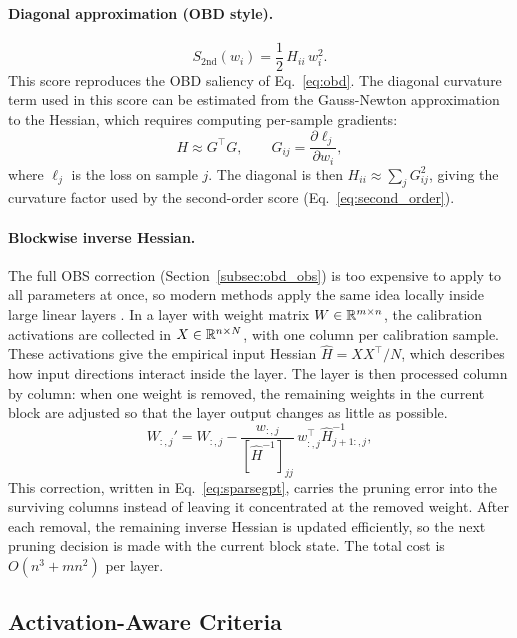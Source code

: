 \paragraph{Diagonal approximation (OBD style).}
\begin{equation}
	S_{\mathrm{2nd}}(w_i) = \frac{1}{2}\,H_{ii}\,w_i^2.
	\label{eq:second_order}
\end{equation}
This score reproduces the OBD saliency of Eq.~\eqref{eq:obd}. The diagonal curvature term used in this score can be estimated from the Gauss-Newton approximation to the Hessian,
which requires computing per-sample gradients:
\begin{equation}
	H \approx G^\top G, \qquad G_{ij} = \frac{\partial \ell_j}{\partial w_i},
\end{equation}
where $\ell_j$ is the loss on sample $j$. The diagonal is then
$H_{ii} \approx \sum_j G_{ij}^2$, giving the curvature factor used by the second-order score (Eq.~\eqref{eq:second_order}).

\paragraph{Blockwise inverse Hessian.}
The full OBS correction (Section~\ref{subsec:obd_obs}) is too expensive to apply to all parameters at once, so modern methods apply the same idea locally inside large linear layers \cite{hassibi1993second,frantar2023sparsegpt}. In a layer with weight matrix $W \in \mathbb{R}^{m \times n}$, the calibration activations are collected in $X \in \mathbb{R}^{n \times N}$, with one column per calibration sample. These activations give the empirical input Hessian $\hat{H}=XX^\top/N$, which describes how input directions interact inside the layer. The layer is then processed column by column: when one weight is removed, the remaining weights in the current block are adjusted so that the layer output changes as little as possible.
\begin{equation}
	W_{:,j}' = W_{:,j} - \frac{w_{:,j}}{[\hat{H}^{-1}]_{jj}}\, w_{:,j}^\top \hat{H}^{-1}_{j+1:, j},
	\label{eq:sparsegpt}
\end{equation}
This correction, written in Eq.~\eqref{eq:sparsegpt}, carries the pruning error into the surviving columns instead of leaving it concentrated at the removed weight. After each removal, the remaining inverse Hessian is updated efficiently, so the next pruning decision is made with the current block state. The total cost is $O(n^3 + mn^2)$ per layer.

\subsection{Activation-Aware Criteria}
\label{subsec:activation_aware_criteria}

